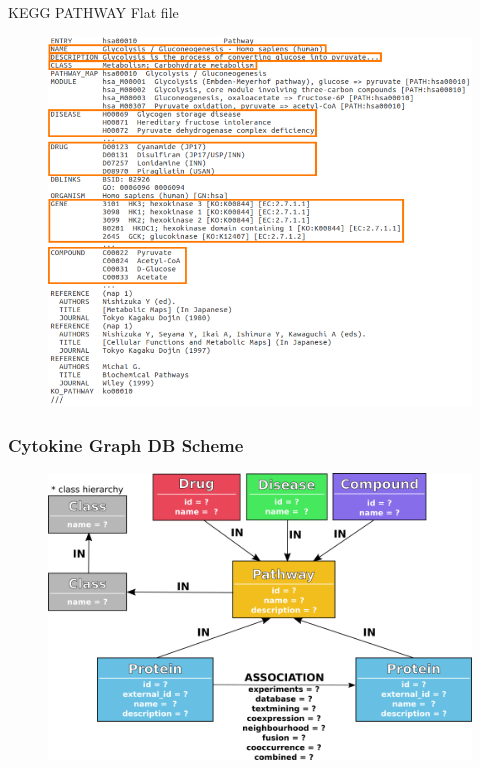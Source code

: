 \documentclass{beamer}
\begin{document}
\begin{frame}{KEGG PATHWAY Flat file}
\begin{figure}
    \centering
    \includegraphics[width=0.8\linewidth]{kegg-flat-file.png}
\end{figure}
\end{frame}

\begin{frame}
\frametitle{Cytokine Graph DB Scheme}
\begin{figure}
    \centering
    \includegraphics[width=0.9\linewidth]{database_scheme.png}
\end{figure}
\end{frame}
\end{document}
